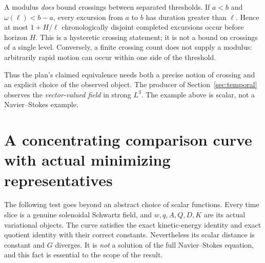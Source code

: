 \documentclass[11pt,a4paper]{article}
\theoremstyle{definition}\newtheorem{definition}[theorem]{Definition}
\theoremstyle{remark}\newtheorem{remark}[theorem]{Remark}
\numberwithin{equation}{section}
\begin{document}
A modulus \emph{does} bound crossings between separated thresholds. If $a<b$ and $\omega(\ell)<b-a$, every excursion from $a$ to $b$ has duration greater than $\ell$. Hence at most $1+H/\ell$ chronologically disjoint completed excursions occur before horizon $H$. This is a hysteretic crossing statement; it is not a bound on crossings of a single level. Conversely, a finite crossing count does not supply a modulus: arbitrarily rapid motion can occur within one side of the threshold.

Thus the plan's claimed equivalence needs both a precise notion of crossing and an explicit choice of the observed object. The producer of Section~\ref{sec:temporal} observes the \emph{vector-valued field} in strong $L^3$. The example above is scalar, not a Navier--Stokes example.

\section{A concentrating comparison curve with actual minimizing representatives}
\label{sec:curve}
The following test goes beyond an abstract choice of scalar functions. Every time slice is a genuine solenoidal Schwartz field, and $w,q,A,Q,D,K$ are its actual variational objects. The curve satisfies the exact kinetic-energy identity and exact quotient identity with their correct constants. Nevertheless its scalar distance is constant and $G$ diverges. It is \emph{not} a solution of the full Navier--Stokes equation, and this fact is essential to the scope of the result.
\end{document}

